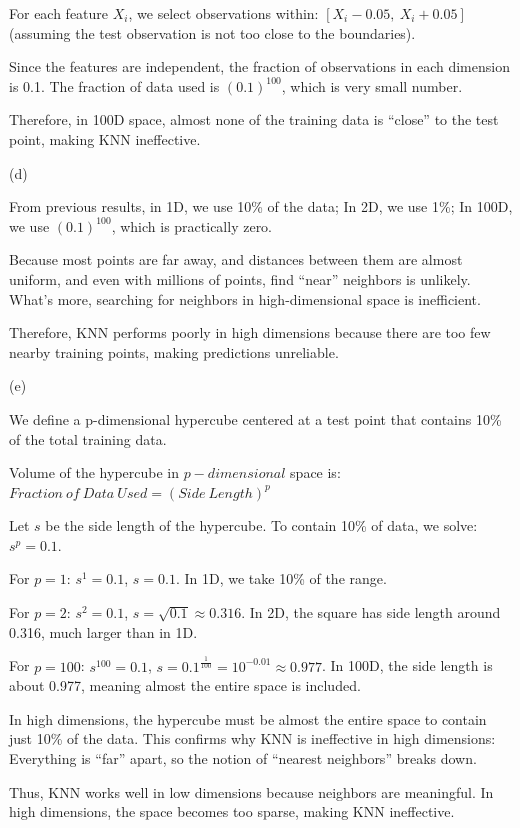 \documentclass[
]{article}
\begin{document}
For each feature \(X_i\), we select observations within:
\([X_i−0.05,\ X_i+0.05]\) (assuming the test observation is not too
close to the boundaries).

Since the features are independent, the fraction of observations in each
dimension is 0.1. The fraction of data used is \((0.1)^{100}\), which is
very small number.

Therefore, in 100D space, almost none of the training data is ``close''
to the test point, making KNN ineffective.

(d)

From previous results, in 1D, we use 10\% of the data; In 2D, we use
1\%; In 100D, we use \((0.1)^{100}\), which is practically zero.

Because most points are far away, and distances between them are almost
uniform, and even with millions of points, find ``near'' neighbors is
unlikely. What's more, searching for neighbors in high-dimensional space
is inefficient.

Therefore, KNN performs poorly in high dimensions because there are too
few nearby training points, making predictions unreliable.

(e)

We define a p-dimensional hypercube centered at a test point that
contains 10\% of the total training data.

Volume of the hypercube in \(p-dimensional\) space is:
\(Fraction\ of\ Data\ Used = ( Side\ Length )^𝑝\)

Let \(s\) be the side length of the hypercube. To contain 10\% of data,
we solve: \(s^p = 0.1\).

For \(𝑝= 1\): \(s^1 = 0.1\), \(s=0.1\). In 1D, we take 10\% of the
range.

For \(𝑝= 2\): \(s^2 = 0.1\), \(s=\sqrt{0.1} \approx 0.316\). In 2D, the
square has side length around 0.316, much larger than in 1D.

For \(𝑝= 100\): \(s^{100} = 0.1\),
\(s=0.1^{\frac{1}{100}} = 10^{-0.01} \approx 0.977\). In 100D, the side
length is about 0.977, meaning almost the entire space is included.

In high dimensions, the hypercube must be almost the entire space to
contain just 10\% of the data. This confirms why KNN is ineffective in
high dimensions: Everything is ``far'' apart, so the notion of ``nearest
neighbors'' breaks down.

Thus, KNN works well in low dimensions because neighbors are meaningful.
In high dimensions, the space becomes too sparse, making KNN
ineffective.
\end{document}
